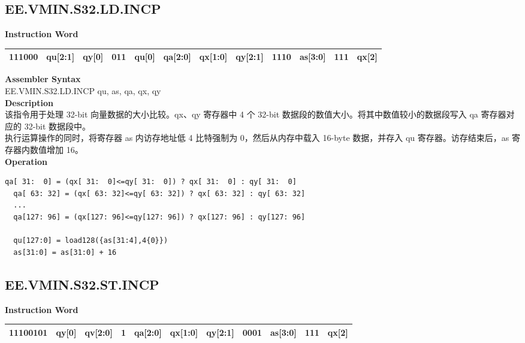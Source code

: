 \clearpage
\subsection{EE.VMIN.S32.LD.INCP}\label{instruction:EEVMINS32LDINCP}
\setlength\tabcolsep{6pt}
\textbf{Instruction Word} \\
\begin{tabular}{|c|c|c|c|c|c|c|c|c|c|c|c|}
	\hline
	111000 & qu[2:1] & qy[0] & 011 & qu[0] & qa[2:0] & qx[1:0] & qy[2:1] & 1110 & as[3:0] & 111 & qx[2] \\
	\hline
\end{tabular}

\textbf{Assembler Syntax} \\
EE.VMIN.S32.LD.INCP qu, as, qa, qx, qy \\
\textbf{Description} \\
该指令用于处理 32-bit 向量数据的大小比较。qx、qy 寄存器中 4 个 32-bit 数据段的数值大小。将其中数值较小的数据段写入 qa 寄存器对应的 32-bit 数据段中。\\
执行运算操作的同时，将寄存器 as 内访存地址低 4 比特强制为 0，然后从内存中载入 16-byte 数据，并存入 qu 寄存器。访存结束后，as 寄存器内数值增加 16。\\
\textbf{Operation}
\begin{lstlisting}[escapeinside=`?]
  qa[ 31:  0] = (qx[ 31:  0]<=qy[ 31:  0]) ? qx[ 31:  0] : qy[ 31:  0]
  qa[ 63: 32] = (qx[ 63: 32]<=qy[ 63: 32]) ? qx[ 63: 32] : qy[ 63: 32]
  ...
  qa[127: 96] = (qx[127: 96]<=qy[127: 96]) ? qx[127: 96] : qy[127: 96]

  qu[127:0] = load128({as[31:4],4{0}})
  as[31:0] = as[31:0] + 16
\end{lstlisting}

\clearpage
\subsection{EE.VMIN.S32.ST.INCP}\label{instruction:EEVMINS32STINCP}
\setlength\tabcolsep{6pt}
\textbf{Instruction Word} \\
\begin{tabular}{|c|c|c|c|c|c|c|c|c|c|c|}
	\hline
	11100101 & qy[0] & qv[2:0] & 1 & qa[2:0] & qx[1:0] & qy[2:1] & 0001 & as[3:0] & 111 & qx[2] \\
	\hline
\end{tabular}

